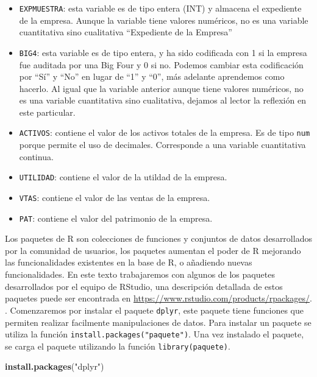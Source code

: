 \documentclass[]{book}
\newenvironment{Shaded}{\begin{snugshade}}{\end{snugshade}}
\newcommand{\KeywordTok}[1]{\textcolor[rgb]{0.13,0.29,0.53}{\textbf{#1}}}
\newcommand{\StringTok}[1]{\textcolor[rgb]{0.31,0.60,0.02}{#1}}
\newcommand{\NormalTok}[1]{#1}
\providecommand{\tightlist}{%
  \setlength{\itemsep}{0pt}\setlength{\parskip}{0pt}}
\begin{document}
\begin{itemize}
\tightlist
\item
  \texttt{EXPMUESTRA}: esta variable es de tipo entera (INT) y almacena
  el expediente de la empresa. Aunque la variable tiene valores
  numéricos, no es una variable cuantitativa sino cualitativa
  ``Expediente de la Empresa''
\item
  \texttt{BIG4}: esta variable es de tipo entera, y ha sido codificada
  con 1 si la empresa fue auditada por una Big Four y 0 si no. Podemos
  cambiar esta codificación por ``Sí'' y ``No'' en lugar de ``1'' y
  ``0'', más adelante aprendemos como hacerlo. Al igual que la variable
  anterior aunque tiene valores numéricos, no es una variable
  cuantitativa sino cualitativa, dejamos al lector la reflexión en este
  particular.
\item
  \texttt{ACTIVOS}: contiene el valor de los activos totales de la
  empresa. Es de tipo \texttt{num} porque permite el uso de decimales.
  Corresponde a una variable cuantitativa continua.
\item
  \texttt{UTILIDAD}: contiene el valor de la utildad de la empresa.
\item
  \texttt{VTAS}: contiene el valor de las ventas de la empresa.
\item
  \texttt{PAT}: contiene el valor del patrimonio de la empresa.
\end{itemize}

Los paquetes de R son colecciones de funciones y conjuntos de datos
desarrollados por la comunidad de usuarios, los paquetes aumentan el
poder de R mejorando las funcionalidades existentes en la base de R, o
añadiendo nuevas funcionalidades. En este texto trabajaremos con algunos
de los paquetes desarrollados por el equipo de RStudio, una descripción
detallada de estos paquetes puede ser encontrada en
\url{https://www.rstudio.com/products/rpackages/}. . Comenzaremos por
instalar el paquete \texttt{dplyr}, este paquete tiene funciones que
permiten realizar facilmente manipulaciones de datos. Para instalar un
paquete se utiliza la función \texttt{install.packages("paquete")}. Una
vez instalado el paquete, se carga el paquete utilizando la función
\texttt{library(paquete)}.

\begin{Shaded}
\begin{Highlighting}[]
\KeywordTok{install.packages}\NormalTok{(}\StringTok{"dplyr"}\NormalTok{)}
\end{Highlighting}
\end{Shaded}
\end{document}
